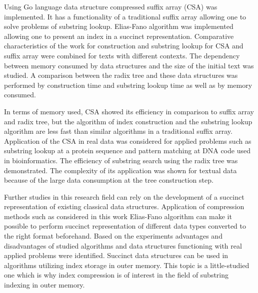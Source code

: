 
Using Go language data structure compressed suffix array (CSA) was implemented.
It has a functionality of a traditional suffix array allowing one to solve
problems of substring lookup. Elias-Fano algorithm was implemented allowing one
to present an index in a succinct representation. Comparative characteristics of
the work for construction and substring lookup for CSA and suffix array were combined
for texts with different contexts.
The dependency between memory consumed by data structures and the size of the initial text
was studied. A comparison between the radix tree and these data structures was performed
by construction time and substring lookup time as well as by memory consumed.

In terms of memory used, CSA showed its efficiency in comparison to suffix array and radix tree,
but the algorithm of index construction and the substring lookup algorithm are less fast
than similar algorithms in a traditional suffix array. Application of the CSA in real data
was considered for applied problems such as substring lookup at a protein sequence and
pattern matching at DNA code used in bioinformatics.
The efficiency of substring search using the radix tree was demonstrated. The complexity
of its application was shown for textual data because of the large data consumption at the tree construction step.

Further studies in this research field can rely on the development of a succinct representation of
existing classical data structures. Application of compression methods such as
considered in this work Elias-Fano algorithm can make it possible to perform
succinct representation of different data types converted to the right format beforehand.
Based on the experiments advantages and disadvantages of studied algorithms and data structures
functioning with real applied problems were identified.
Succinct data structures can be used in algorithms utilizing index storage in outer memory.
This topic is a little-studied one which is why index compression is of interest in
the field of substring indexing in outer memory.
